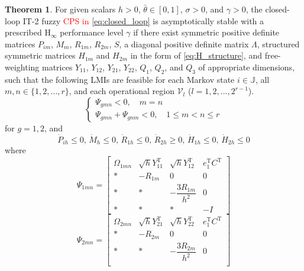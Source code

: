 \documentclass[preprint,review,fleqn,sort&compress,3p]{elsarticle}
\theoremstyle{definition} %
\theoremstyle{definition}%
\newtheorem{thm}{Theorem}[section]
\begin{document}
	\begin{thm}\label{thm1}
		For given scalars $h>0$, $\bar{\theta}\in[0,1]$, $\sigma>0$, and $\gamma>0$, the closed-loop IT-2 fuzzy \textcolor{red}{CPS in} \eqref{eq:closed_loop} is asymptotically stable with a prescribed $\mathrm{H}_\infty$ performance level $\gamma$ if there exist symmetric positive definite matrices
		$P_{im}$, $M_m$, $R_{1m}$, $R_{2m}$, $S$, a diagonal positive definite matrix $\Lambda$,
		structured symmetric matrices $H_{1m}$ and $H_{2m}$ in the form of \eqref{eq:H_structure},
		and free-weighting matrices
		$Y_{11}$, $Y_{12}$, $Y_{21}$, $Y_{22}$, $Q_1$, $Q_2$, and $Q_3$
		of appropriate dimensions, such that the following LMIs are feasible for each Markov state $i\in\mathbb{J}$, all $m,n\in\{1,2,\ldots,r\}$, and each operational region $\mathcal V_l$ ($l=1,2,\ldots,2^{r-1}$).
		\begin{equation}\label{shucr1}
			\begin{cases}
				\Psi_{gmn} < 0 ,\quad  m=n  \\
				\Psi_{gmn} + \Psi_{gnm} < 0,\quad 1 \le m < n \le r
			\end{cases}
		\end{equation}
		for $g=1,2$, and
		\begin{equation}\label{dot_small_0}
			\dot{P}_{ih} \leq 0, \, 
			\dot{M}_{h} \leq 0, \, 
			\dot{R}_{1h} \leq 0, \, 
			\dot{R}_{2h} \geq 0, \, 
			\dot{H}_{1h} \leq 0, \, 
			\dot{H}_{2h} \leq 0
		\end{equation}
		where
		\begin{equation}\label{LMI1}
			\Psi_{1mn} =
			\begin{bmatrix}
				\Omega_{1mn} & \sqrt{h}Y_{11}^{\mathrm{T}} & \sqrt{h}Y_{12}^{\mathrm{T}} & e_1^{\mathrm{T}} C^{\mathrm{T}} \\[1.5ex]
				* & -R_{1m} & 0 & 0  \\[1.5ex]
				* & * & -\dfrac{3R_{1m}}{h^2} & 0 \\[1.5ex]
				* & * & * & -I
			\end{bmatrix}
		\end{equation}
		\begin{equation}\label{LMI2}
			\Psi_{2mn} =
			\begin{bmatrix}
				\Omega_{2mn} & \sqrt{h}Y_{21}^{\mathrm{T}} & \sqrt{h}Y_{22}^{\mathrm{T}} & e_1^{\mathrm{T}} C^{\mathrm{T}} \\[1.5ex]
				* & -R_{2m} & 0 & 0 \\[1.5ex]
				* & * & -\dfrac{3R_{2m}}{h^2} & 0  \\[1.5ex]

\end{bmatrix}
\end{equation}
\end{thm}
\end{document}
